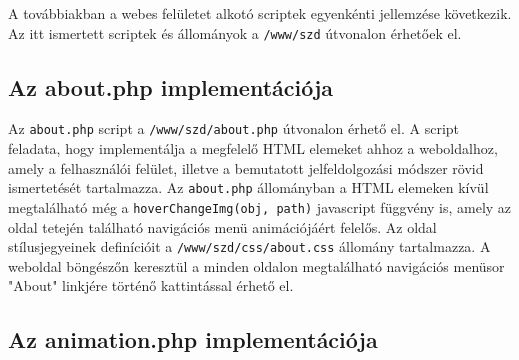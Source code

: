 \documentclass[oneside,titlepage,12pt,a4paper]{report}
\begin{document}
A továbbiakban a webes felületet alkotó scriptek egyenkénti jellemzése következik. Az itt ismertett scriptek és állományok a \texttt{/www/szd} útvonalon érhetőek el. 

\subsection{Az about.php implementációja}

Az \texttt{about.php} script a \texttt{/www/szd/about.php} útvonalon érhető el. A script feladata, hogy implementálja a megfelelő HTML elemeket ahhoz a weboldalhoz, amely a felhasználói felület, illetve a bemutatott jelfeldolgozási módszer rövid ismertetését tartalmazza. Az \texttt{about.php} állományban a HTML elemeken kívül megtalálható még a \texttt{hoverChangeImg(obj, path)} javascript függvény is, amely az oldal tetején található navigációs menü animációjáért felelős. Az oldal stílusjegyeinek definícióit a \texttt{/www/szd/css/about.css} állomány tartalmazza. A weboldal böngészőn keresztül a minden oldalon megtalálható navigációs menüsor "About" linkjére történő kattintással érhető el.

\subsection{Az animation.php implementációja}
\end{document}
